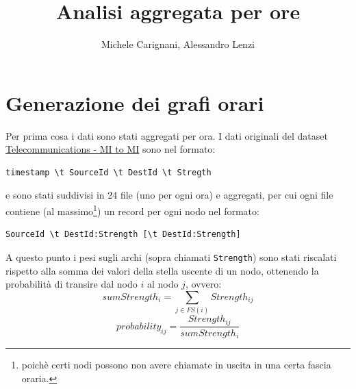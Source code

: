 \documentclass[10pt,a4paper]{article}
\author{Michele Carignani, Alessandro Lenzi}
\title{Analisi aggregata per ore}
\begin{document}
\maketitle

\section{Generazione dei grafi orari}

Per prima cosa i dati sono stati aggregati per ora. I dati originali del dataset 
\href{https://dandelion.eu/datagem/telecom-mi-to-mi/description/}{Telecommunications - MI to MI} sono nel formato:
\begin{verbatim}
timestamp \t SourceId \t DestId \t Stregth
\end{verbatim}
e sono stati suddivisi in 24 file (uno per ogni ora) e aggregati, per cui
ogni file contiene (al massimo\footnote{poichè certi nodi possono non avere chiamate in uscita
in una certa fascia oraria.}) un record per ogni nodo nel formato:
\begin{verbatim}
SourceId \t DestId:Strength [\t DestId:Strength]
\end{verbatim}

A questo punto i pesi sugli archi (sopra chiamati \verb!Strength!) sono stati riscalati rispetto alla somma
dei valori della stella uscente di un nodo, ottenendo la probabilità di transire dal nodo $i$ al 
nodo $j$, ovvero:
$$ sumStrength_i = \sum_{j \in FS(i)} Strength_{ij} $$
$$ probability_{ij} = \frac{Strength_{ij}}{sumStrength_i} $$
\end{document}
